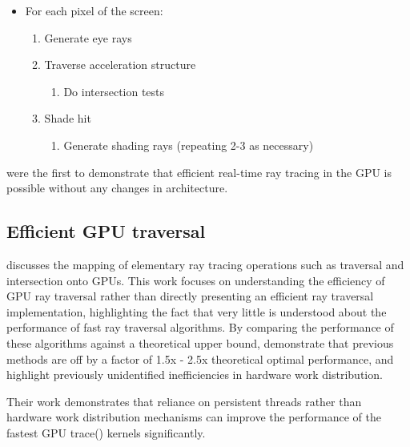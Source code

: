\begin{itemize}
	\item For each pixel of the screen:

	\begin{enumerate}
		\item Generate eye rays
		\item Traverse acceleration structure

			\begin{enumerate}
				\item Do intersection tests
			\end{enumerate}

		\item Shade hit

			\begin{enumerate}
				\item Generate shading rays (repeating 2-3 as necessary)
			\end{enumerate}

	\end{enumerate}
\end{itemize}

\citeauthor{purcell02gpuraytracing} were the first to demonstrate that efficient real-time ray tracing in the GPU is possible without any changes in architecture.

\let\labelitemi\oldlabelitemi

\subsection{Efficient GPU traversal}
\cite{aila2009hpg} discusses the mapping of elementary ray tracing operations such as traversal and intersection onto GPUs. This work focuses on understanding the efficiency of GPU ray traversal rather than directly presenting an efficient ray traversal implementation, highlighting the fact that very little is understood about the performance of fast ray traversal algorithms. By comparing the performance of these algorithms against a theoretical upper bound, \citeauthor{aila2009hpg} demonstrate that previous methods are off by a factor of 1.5x - 2.5x theoretical optimal performance, and highlight previously unidentified inefficiencies in hardware work distribution.

Their work demonstrates that reliance on persistent threads rather than hardware work distribution mechanisms can improve the performance of the fastest GPU trace() kernels significantly.

